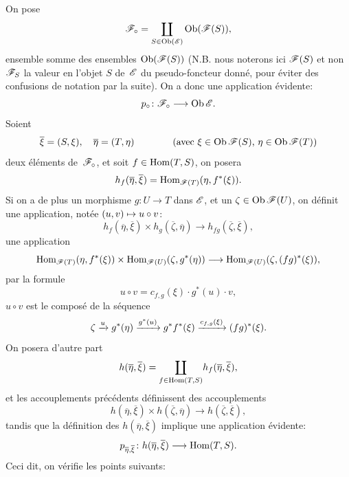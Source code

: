 On pose
$$
\cal{F}_\circ=\underset{S\in\Ob(\cal{E})}\coprod
\Ob(\cal{F}(S)),
$$
ensemble somme des ensembles
$\Ob(\cal{F}(S))$
(N.B. nous noterons ici $\cal{F}(S)$ et non $\cal{F}_S$ la valeur en
l'objet $S$ de~$\cal{E}$ du pseudo-foncteur donn\'e, pour \'eviter
des confusions de notation par la suite). On a donc une application
\'evidente:
$$
p_\circ\colon\cal{F}_\circ\to\Ob\cal{E}.
$$
Soient
$$
\overline{\xi}
=(S,\xi),\quad \overline{\eta}=(T,\eta)\qquad\qquad
\text{(avec $\xi\in\Ob\cal{F}(S)$, $\eta\in\Ob\cal{F}(T)$)}
$$
deux \'el\'ements de~$\cal{F}_\circ$, et soit $f\in\operatorname{Hom}(T,S)$, on
posera
$$
h_f(\overline{\eta},\overline{\xi})=\Hom_{\cal{F}(T)}(\eta,f^*(\xi)).
$$
Si on a de plus un morphisme $g\colon U\to T$ dans $\cal{E}$, et un
$\zeta\in\Ob\cal{F}(U)$, on d\'efinit une application, not\'ee
$(u,v)\mto u\circ v$:
$$
h_f(\overline{\eta},\overline{\xi})\times
h_g(\overline{\zeta},\overline{\eta})\to
h_{fg}(\overline{\zeta},\overline{\xi}),
$$
\ie une application
$$
\Hom_{\cal{F}(T)}(\eta,f^*(\xi))\times\Hom_{\cal{F}(U)}(\zeta,g^*(\eta))
\to \Hom_{\cal{F}(U)}(\zeta,(fg)^*(\xi)),
$$
par la formule
$$
u\circ v=c_{f,g}(\xi)\cdot g^*(u)\cdot v,
$$
\ie $u\circ v$ est le compos\'e de la s\'equence
$$
\zeta\xrightarrow{u}
g^*(\eta)\xrightarrow{g^*(u)}
g^*f^*(\xi)\xrightarrow{c_{f,g}(\xi)} (fg)^*(\xi).
$$
On posera d'autre part
$$
h(\overline{\eta},\overline{\xi})=\underset{f\in\operatorname{Hom}(T,S)}\coprod
h_f(\overline{\eta},\overline{\xi}),
$$
et les accouplements pr\'ec\'edents d\'efinissent des
accouplements
$$
h(\overline{\eta},\overline{\xi})\times
h(\overline{\zeta},\overline{\eta})\to
h(\overline{\zeta},\overline{\xi}),
$$
tandis que la d\'efinition des $h(\overline{\eta},\overline{\xi})$
implique une application \'evidente:
$$
p_{\overline{\eta},\overline{\xi}}\colon
h(\overline{\eta},\overline{\xi})\to \Hom(T,S).
$$
Ceci dit, on v\'erifie les points suivants:
